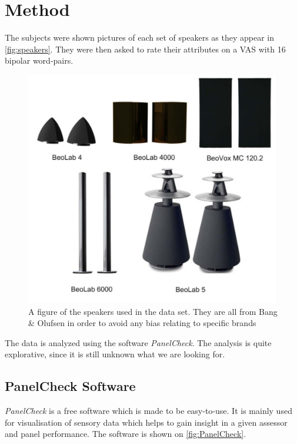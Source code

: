\section*{Method}
\label{Method}
The subjects were shown pictures of each set of speakers as they appear in \autoref{fig:speakers}. They were then asked to rate their attributes on a VAS with 16 bipolar word-pairs. 

\begin{figure}[H]
\centering
\includegraphics[scale = 0.7]{Figure/speakers.png}
\caption{A figure of the speakers used in the data set. They are all from Bang \& Olufsen in order to avoid any bias relating to specific brands}
\label{fig:speakers}
\end{figure}

The data is analyzed using the software \textit{PanelCheck}. The analysis is quite explorative, since it is still unknown what we are looking for. 

\subsection*{PanelCheck Software}
\textit{PanelCheck} is a free software which is made to be easy-to-use. It is mainly used for visualisation of sensory data which helps to gain insight in a given assessor and panel performance. The software is shown on \autoref{fig:PanelCheck}.

